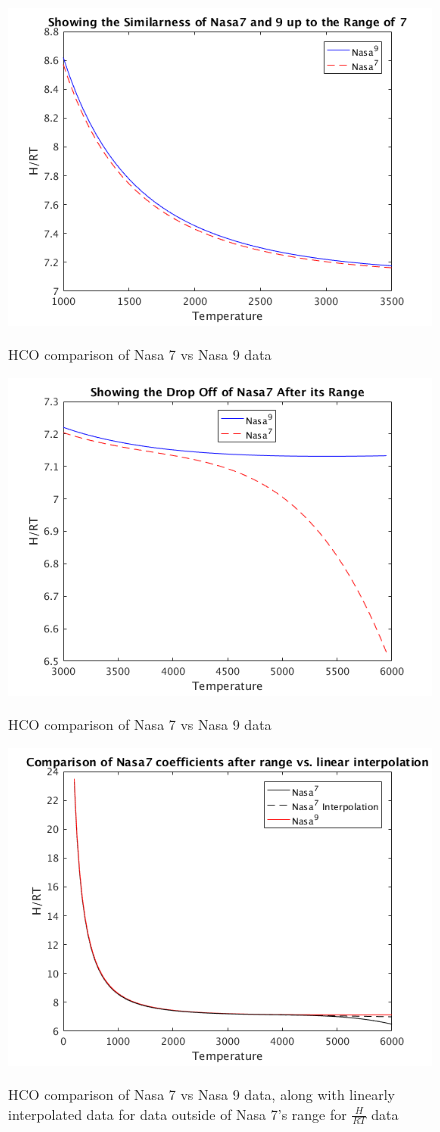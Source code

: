 \documentclass{article}
\begin{document}
\begin{figure}[!p]
  \centering
  \includegraphics[width=.8\linewidth]{./NasaPlots/H2.png}
  \label{fig:H2}
  \caption{HCO comparison of Nasa 7 vs Nasa 9 data}
\end{figure}


\begin{figure}[!p]
  \centering
  \includegraphics[width=.8\linewidth]{./NasaPlots/H3.png}
  \label{fig:H3}
  \caption{HCO comparison of Nasa 7 vs Nasa 9 data}
\end{figure}

\begin{figure}[!p]
  \centering
  \includegraphics[width=.8\linewidth]{./NasaPlots/HT.png}
  \label{fig:HT}
  \caption{HCO comparison of Nasa 7 vs Nasa 9 data, along with linearly interpolated data for data outside of Nasa 7's range for $\frac{H}{RT}$ data}
\end{figure}
\end{document}
